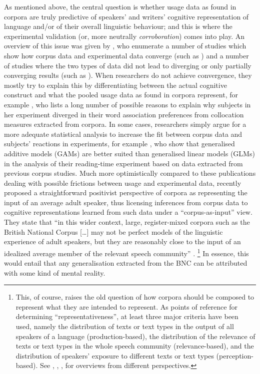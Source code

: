 As mentioned above, the central question is whether usage data as found in corpora are truly predictive of speakers' and writers' cognitive representation of language and\slash or of their overall linguistic behaviour; and this is where the experimental validation (or, more neutrally \textit{corroboration}) comes into play.
An overview of this issue was given by \cite{NewmanSorensenduncan2015}, who enumerate a number of studies which show how corpus data and experimental data converge (such as \citealp{BresnanEa2007,DurrantDoherty2010,GriesWulff2005,GriesEa2005}) and a number of studies where the two types of data did not lead to diverging or only partially converging results (such as \citealp{ArppeJaervikivi2007,Dabrowska2014,Mollin2009}).
When researchers do not achieve convergence, they mostly try to explain this by differentiating between the actual cognitive construct and what the pooled usage data as found in corpora represent, for example \citet[411]{Dabrowska2014}, who lists a long number of possible reasons to explain why subjects in her experiment diverged in their word association preferences from collocation measures extracted from corpora.
In some cases, researchers simply argue for a more adequate statistical analysis to increase the fit between corpus data and subjects' reactions in experiments, for example \cite{DivjakEa2016}, who show that generalised additive models (GAMs) are better suited than generalised linear models (GLMs) in the analysis of their reading-time experiment based on data extracted from previous corpus studies.
Much more optimistically compared to these publications dealing with possible frictions between usage and experimental data, \cite{StefanowitschFlach2016} recently proposed a straightforward positivist perspective of corpora as representing the input of an average adult speaker, thus licensing inferences from corpus data to cognitive representations learned from such data under a ``corpus-as-input'' view.
They state that ``in this wider context, large, register-mixed corpora such as the British National Corpus [\ldots] may not be perfect models of the linguistic experience of adult speakers, but they are reasonably close to the input of an idealized average member of the relevant speech community'' \citep[104]{StefanowitschFlach2016}.%
\footnote{This, of course, raises the old question of how corpora should be composed to represent what they are intended to represent.
As points of reference for determining ``representativeness'', at least three major criteria have been used, namely the distribution of texts or text types in the output of all speakers of a language (production-based), the distribution of the relevance of texts or text types in the whole speech community (relevance-based), and the distribution of speakers' exposure to different texts or text types (perception-based).
See \citet{Biber1993}, \citet{MceneryEa2006}, \citet{Leech2007}, \citet{Hunston2008} for overviews from different perspectives.}
In essence, this would entail that any generalisation extracted from the BNC can be attributed with some kind of mental reality.

